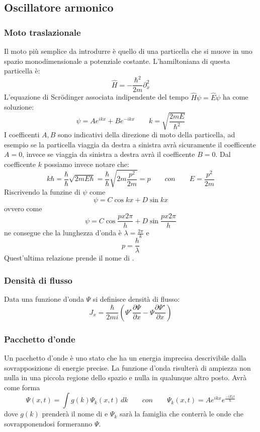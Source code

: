 \subsection{Oscillatore armonico}
\subsubsection{Moto traslazionale}
Il moto più semplice da introdurre è quello di una particella che si muove in uno spazio monodimensionale a potenziale costante. L'hamiltoniana di questa particella è:
$$\hat{H} = - \frac{\hbar^2}{2m} \partial_x^2$$
L'equazione di Scr\"odinger associata indipendente del tempo $\hat{H}\psi = \hat{E}\psi$ ha come soluzione:
$$\psi = A e^{i k x} + B e^{- i k x} \qquad k = \sqrt{\frac{2 m E}{\hbar^2}}$$
I coefficenti $A, B$ sono indicativi della direzione di moto della particella, ad esempio se la particella viaggia da destra a sinistra avrà sicuramente il coefficente $A = 0$, invece se viaggia da sinistra a destra avrà il coefficente $B = 0$.
Dal coefficente $k$ possiamo invece notare che:
$$k\hbar = \frac{\hbar}{\hbar} \sqrt{2 m E \hbar} = \frac{\hbar}{\hbar} \sqrt{2 m \frac{p^2}{2 m}} = p \qquad con \qquad E = \frac{p^2}{2m}$$
Riscrivendo la funzine di $\psi$ come
$$\psi = C \cos{kx} + D \sin{kx}$$
ovvero come
$$\psi = C \cos{\frac{p x 2 \pi}{h}} + D \sin{\frac{p x 2 \pi}{h}}$$
ne consegue che la lunghezza d'onda è $\lambda = \frac{2\pi}{k}$ e
$$p = \frac{h}{\lambda}$$
Quest'ultima relazione prende il nome di .

\subsubsection{Densità di flusso}
Data una funzione d'onda $\Psi$ si definisce densità di flusso:
$$J_x = \frac{\hbar}{2mi}\left(\Psi^{\star} \frac{\partial \Psi}{\partial x} - \Psi \frac{\partial \Psi^{\star}}{\partial x}  \right)$$

\subsubsection{Pacchetto d'onde}
Un pacchetto d'onde è uno stato che ha un energia imprecisa descrivibile dalla sovrapposizione di energie precise.
La funzione d'onda risulterà di ampiezza non nulla in una piccola regione dello spazio e nulla in qualunque altro posto.
Avrà come forma
$$\Psi(x, t) = \int g(k) \Psi_k(x, t) \, dk \qquad con \qquad \Psi_k(x, t) = A e^{ikx} e^{\frac{-i E_k t}{\hbar}}$$
dove $g(k)$ prenderà il nome di  e $\Psi_k$ sarà la famiglia che conterrà le onde che sovrapponendosi formeranno $\Psi$.

